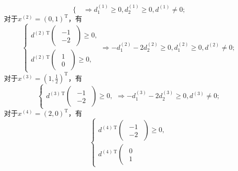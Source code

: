 \begin{enumerate}
\begin{enumerate}[label=(\arabic*)]
\[\begin{cases}
        \end{cases} \Rightarrow d_1^{(1)} \geqslant 0, d_2^{(1)} \geqslant 0, d^{(1)} \neq 0;\]
        对于$x^{(2)}=(0,1)^{\mathrm{T}}$，有
        \[\begin{cases}
            d^{(2)\,\mathrm{T}} \left(\begin{array}{cc}
                \begin{matrix}
                    -1\\-2
                \end{matrix}
            \end{array}\right) \geqslant 0,\\
            d^{(2)\,\mathrm{T}} \left(\begin{array}{cc}
                \begin{matrix}
                    1\\0
                \end{matrix}
            \end{array}\right) \geqslant 0,
        \end{cases} \Rightarrow -d_1^{(2)}-2d_2^{(2)} \geqslant 0, d_1^{(2)} \geqslant 0, d^{(2)} \neq 0;\]
        对于$\displaystyle x^{(3)}=\left(1,\frac{1}{2}\right)^{\mathrm{T}}$，有
        \[\begin{cases}
            d^{(3)\,\mathrm{T}} \left(\begin{array}{cc}
                \begin{matrix}
                    -1\\-2
                \end{matrix}
            \end{array}\right) \geqslant 0,
        \end{cases} \Rightarrow -d_1^{(3)}-2d_2^{(3)} \geqslant 0, d^{(3)} \neq 0;\]
        对于$x^{(4)}=(2,0)^{\mathrm{T}}$，有
        \[\begin{cases}
            d^{(4)\,\mathrm{T}} \left(\begin{array}{cc}
                \begin{matrix}
                    -1\\-2
                \end{matrix}
            \end{array}\right) \geqslant 0,\\
            d^{(4)\,\mathrm{T}} \left(\begin{array}{cc}
                \begin{matrix}
                    0\\1

\end{matrix}
\end{array}
\end{cases}\]
\end{enumerate}
\end{enumerate}
